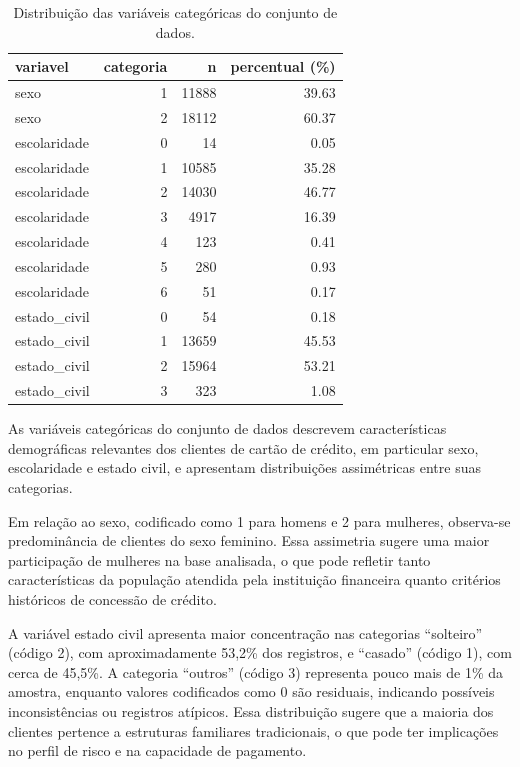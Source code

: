 \documentclass[
  brazilian,
  12pt,
  letterpaper,
  DIV=11,
  numbers=noendperiod]{scrartcl}
\begin{document}
{

\begin{longtable}[]{@{}lrrr@{}}

\caption{\label{tbl-categoricas-default}Distribuição das variáveis
categóricas do conjunto de dados.}

\tabularnewline

\toprule\noalign{}
variavel & categoria & n & percentual (\%) \\
\midrule\noalign{}
\endhead
\bottomrule\noalign{}
\endlastfoot
sexo & 1 & 11888 & 39.63 \\
sexo & 2 & 18112 & 60.37 \\
escolaridade & 0 & 14 & 0.05 \\
escolaridade & 1 & 10585 & 35.28 \\
escolaridade & 2 & 14030 & 46.77 \\
escolaridade & 3 & 4917 & 16.39 \\
escolaridade & 4 & 123 & 0.41 \\
escolaridade & 5 & 280 & 0.93 \\
escolaridade & 6 & 51 & 0.17 \\
estado\_civil & 0 & 54 & 0.18 \\
estado\_civil & 1 & 13659 & 45.53 \\
estado\_civil & 2 & 15964 & 53.21 \\
estado\_civil & 3 & 323 & 1.08 \\

\end{longtable}

}

As variáveis categóricas do conjunto de dados descrevem características
demográficas relevantes dos clientes de cartão de crédito, em particular
sexo, escolaridade e estado civil, e apresentam distribuições
assimétricas entre suas categorias.

Em relação ao sexo, codificado como 1 para homens e 2 para mulheres,
observa-se predominância de clientes do sexo feminino. Essa assimetria
sugere uma maior participação de mulheres na base analisada, o que pode
refletir tanto características da população atendida pela instituição
financeira quanto critérios históricos de concessão de crédito.

A variável estado civil apresenta maior concentração nas categorias
``solteiro'' (código 2), com aproximadamente 53,2\% dos registros, e
``casado'' (código 1), com cerca de 45,5\%. A categoria ``outros''
(código 3) representa pouco mais de 1\% da amostra, enquanto valores
codificados como 0 são residuais, indicando possíveis inconsistências ou
registros atípicos. Essa distribuição sugere que a maioria dos clientes
pertence a estruturas familiares tradicionais, o que pode ter
implicações no perfil de risco e na capacidade de pagamento.
\end{document}
